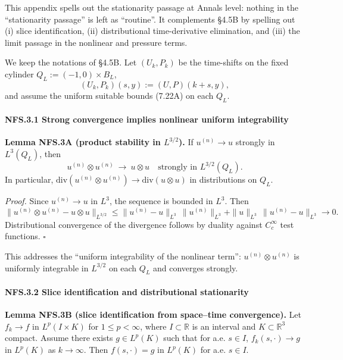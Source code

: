 \documentclass[
  11pt,
]{article}
\begin{document}
This appendix spells out the stationarity passage at Annals level: nothing in the ``stationarity passage'' is left as ``routine''. It complements §4.5B by spelling out (i) slice identification, (ii) distributional time-derivative elimination, and (iii) the limit passage in the nonlinear and pressure terms.

We keep the notations of §4.5B. Let \((U_k,P_k)\) be the time-shifts on the fixed cylinder \(Q_L:=(-1,0)\times B_L\), \[
(U_k,P_k)(s,y) := (U,P)(k+s,y),
\] and assume the uniform suitable bounds (7.22A) on each \(Q_L\).

\hypertarget{nfs.3.1-strong-convergence-implies-nonlinear-uniform-integrability}{%
\paragraph{NFS.3.1 Strong convergence implies nonlinear uniform integrability}\label{nfs.3.1-strong-convergence-implies-nonlinear-uniform-integrability}}

\textbf{Lemma NFS.3A (product stability in \(L^{3/2}\)).} If \(u^{(n)}\to u\) strongly in \(L^3(Q_L)\), then \[
u^{(n)}\otimes u^{(n)}\ \to\ u\otimes u\quad\text{strongly in }L^{3/2}(Q_L).
\] In particular, \(\mathrm{div}(u^{(n)}\otimes u^{(n)})\to \mathrm{div}(u\otimes u)\) in distributions on \(Q_L\).

\emph{Proof.} Since \(u^{(n)}\to u\) in \(L^3\), the sequence is bounded in \(L^3\). Then \[
\|u^{(n)}\otimes u^{(n)}-u\otimes u\|_{L^{3/2}}
\le \|u^{(n)}-u\|_{L^3}\,\|u^{(n)}\|_{L^3} + \|u\|_{L^3}\,\|u^{(n)}-u\|_{L^3}
\to 0.
\] Distributional convergence of the divergence follows by duality against \(C_c^\infty\) test functions. \(\square\)

This addresses the ``uniform integrability of the nonlinear term'': \(u^{(n)}\otimes u^{(n)}\) is uniformly integrable in \(L^{3/2}\) on each \(Q_L\) and converges strongly.

\hypertarget{nfs.3.2-slice-identification-and-distributional-stationarity}{%
\paragraph{NFS.3.2 Slice identification and distributional stationarity}\label{nfs.3.2-slice-identification-and-distributional-stationarity}}

\textbf{Lemma NFS.3B (slice identification from space--time convergence).} Let \(f_k\to f\) in \(L^p(I\times K)\) for \(1\le p<\infty\), where \(I\subset\mathbb R\) is an interval and \(K\subset\mathbb R^3\) compact. Assume there exists \(g\in L^p(K)\) such that for a.e. \(s\in I\), \(f_k(s,\cdot)\to g\) in \(L^p(K)\) as \(k\to\infty\). Then \(f(s,\cdot)=g\) in \(L^p(K)\) for a.e. \(s\in I\).
\end{document}
